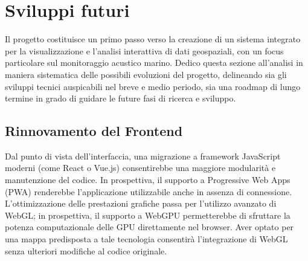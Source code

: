 \section{Sviluppi futuri}
\label{ss:sviluppi-futuri}

Il progetto costituisce un primo passo verso la creazione di un sistema integrato per la visualizzazione e l'analisi interattiva di dati geospaziali, con un focus particolare sul monitoraggio acustico marino. Dedico questa sezione all'analisi in maniera sistematica delle possibili evoluzioni del progetto, delineando sia gli sviluppi tecnici auspicabili nel breve e medio periodo, sia una roadmap di lungo termine in grado di guidare le future fasi di ricerca e sviluppo.

\subsection{Rinnovamento del Frontend}
Dal punto di vista dell'interfaccia, una migrazione a framework JavaScript moderni (come React o Vue.js) consentirebbe una maggiore modularità e manutenzione del codice. In prospettiva, il supporto a Progressive Web Apps (PWA) renderebbe l'applicazione utilizzabile anche in assenza di connessione.
L'ottimizzazione delle prestazioni grafiche passa per l'utilizzo avanzato di WebGL; in prospettiva, il supporto a WebGPU permetterebbe di sfruttare la potenza computazionale delle GPU direttamente nel browser. Aver optato per una mappa predisposta a tale tecnologia consentirà l'integrazione di WebGL senza ulteriori modifiche al codice originale.